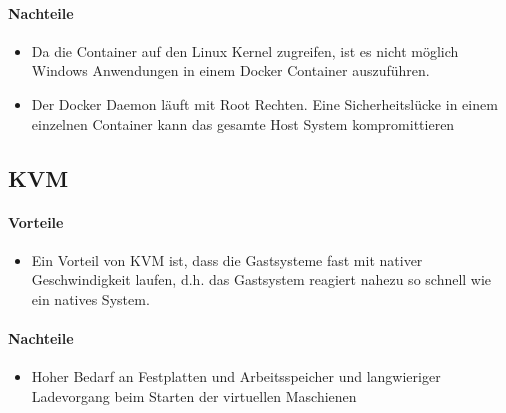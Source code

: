 \paragraph{Nachteile}
\begin{itemize}
	\item Da die Container auf den Linux Kernel zugreifen, ist es nicht möglich Windows Anwendungen in einem Docker Container auszuführen.
	\item Der Docker Daemon läuft mit Root Rechten. Eine Sicherheitslücke in einem einzelnen Container kann das gesamte Host System kompromittieren
\end{itemize}

\subsection{KVM} %
\paragraph{Vorteile}
\begin{itemize}
	\item Ein Vorteil von KVM ist, dass die Gastsysteme fast mit nativer Geschwindigkeit laufen, d.h. das Gastsystem reagiert nahezu so schnell wie ein natives System. 
\end{itemize}
\paragraph{Nachteile}
\begin{itemize}
	\item Hoher Bedarf an Festplatten und Arbeitsspeicher und langwieriger Ladevorgang beim Starten der virtuellen Maschienen
\end{itemize}


